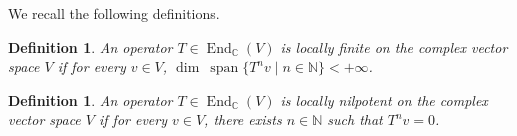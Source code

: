 \documentclass[12pt,reqno]{amsart}
\def\N{\mathbb{N}}
\numberwithin{equation}{section}
\newtheorem{defi}[theo]{Definition}
\begin{document}
We recall the following definitions.
\begin{defi}
    An operator $T\in\operatorname{End}_{\mathbb C}(V)$ is locally finite on the complex vector space $V$ if for every $v\in V$,
$\operatorname{dim}\ \operatorname{span}
\{T^nv\mid n\in\N\}<+\infty$.
\end{defi}
\begin{defi}
    An operator $T\in\operatorname{End}_{\mathbb C}(V)$ is locally nilpotent on the complex vector space $V$ if for every $v\in V$, there exists $n
    \in\N$ such that
$
T^nv=0 $.
\end{defi}
 
\end{document}
